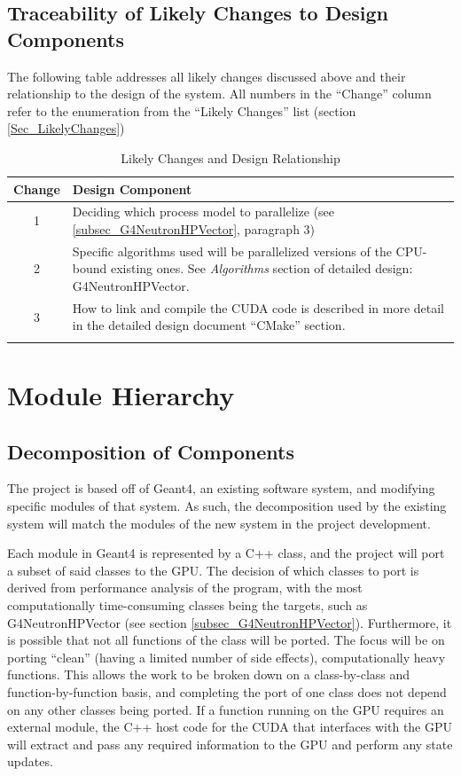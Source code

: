 \documentclass[12pt]{article}
\begin{document}
\subsection{Traceability of Likely Changes to Design Components}
The following table addresses all likely changes discussed above and their relationship to the design of the system. All numbers in the ``Change'' column refer to the enumeration from the ``Likely Changes'' list (section \ref{Sec_LikelyChanges})

\begin{center}
\begin{longtable}{c >{\raggedright\arraybackslash}p{}}

\caption{Likely Changes and Design Relationship}\label{Table_LikelyChangesAndDesign}
\\\toprule
\bf Change & \bf Design Component\\\toprule
\arrayrulecolor{lightgray}

1 & Deciding which process model to parallelize (see \ref{subsec_G4NeutronHPVector}, paragraph 3)\\\hline
2 & Specific algorithms used will be parallelized versions of the CPU-bound existing ones. See \emph{Algorithms} section of detailed design: G4NeutronHPVector.\\\hline
3 & How to link and compile the CUDA code is described in more detail in the detailed design document ``CMake'' section.\\
\arrayrulecolor{black}
\bottomrule
\end{longtable}
\end{center}

\section{Module Hierarchy}%
\subsection{Decomposition of Components}
The project is based off of Geant4, an existing software system, and modifying specific modules of that system. As such, the decomposition used by the existing system will match the modules of the new system in the project development.

Each module in Geant4 is represented by a C++ class, and the project will port a subset of said classes to the GPU. The decision of which classes to port is derived from performance analysis of the program, with the most computationally time-consuming classes being the targets, such as G4NeutronHPVector (see section \ref{subsec_G4NeutronHPVector}). Furthermore, it is possible that not all functions of the class will be ported. The focus will be on porting ``clean'' (having a limited number of side effects), computationally heavy functions. This allows the work to be broken down on a class-by-class and function-by-function basis, and completing the port of one class does not depend on any other classes being ported. If a function running on the GPU requires an external module, the C++ host code for the CUDA that interfaces with the GPU will extract and pass any required information to the GPU and perform any state updates.
\end{document}
